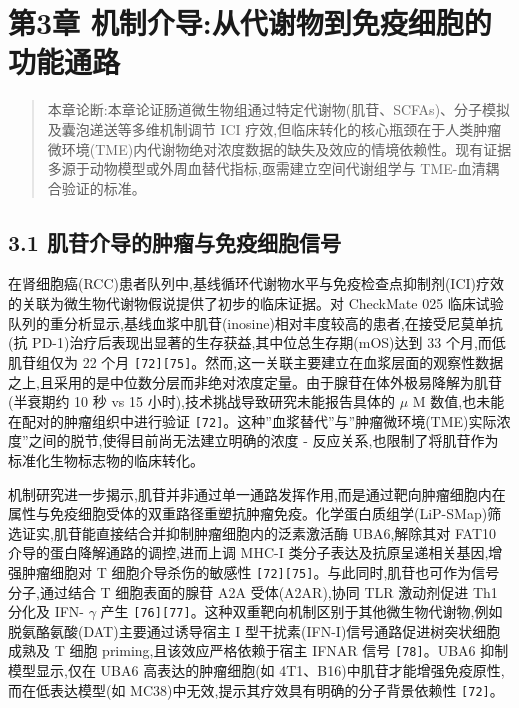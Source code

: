 \section{第3章 机制介导:从代谢物到免疫细胞的功能通路}\label{ux7b2c3ux7ae0-ux673aux5236ux4ecbux5bfcux4eceux4ee3ux8c22ux7269ux5230ux514dux75abux7ec6ux80deux7684ux529fux80fdux901aux8def}

\begin{quote}
本章论断:本章论证肠道微生物组通过特定代谢物(肌苷、SCFAs)、分子模拟及囊泡递送等多维机制调节 ICI 疗效,但临床转化的核心瓶颈在于人类肿瘤微环境(TME)内代谢物绝对浓度数据的缺失及效应的情境依赖性。现有证据多源于动物模型或外周血替代指标,亟需建立空间代谢组学与 TME-血清耦合验证的标准。
\end{quote}

\subsection{3.1 肌苷介导的肿瘤与免疫细胞信号}\label{ux808cux82f7ux4ecbux5bfcux7684ux80bfux7624ux4e0eux514dux75abux7ec6ux80deux4fe1ux53f7}

在肾细胞癌(RCC)患者队列中,基线循环代谢物水平与免疫检查点抑制剂(ICI)疗效的关联为微生物代谢物假说提供了初步的临床证据。对 CheckMate 025 临床试验队列的重分析显示,基线血浆中肌苷(inosine)相对丰度较高的患者,在接受尼莫单抗(抗 PD-1)治疗后表现出显著的生存获益,其中位总生存期(mOS)达到 33 个月,而低肌苷组仅为 22 个月 \texttt{{[}72{]}{[}75{]}}。然而,这一关联主要建立在血浆层面的观察性数据之上,且采用的是中位数分层而非绝对浓度定量。由于腺苷在体外极易降解为肌苷(半衰期约 10 秒 vs 15 小时),技术挑战导致研究未能报告具体的 \(\mu\) M 数值,也未能在配对的肿瘤组织中进行验证 \texttt{{[}72{]}}。这种''血浆替代''与''肿瘤微环境(TME)实际浓度''之间的脱节,使得目前尚无法建立明确的浓度 - 反应关系,也限制了将肌苷作为标准化生物标志物的临床转化。

机制研究进一步揭示,肌苷并非通过单一通路发挥作用,而是通过靶向肿瘤细胞内在属性与免疫细胞受体的双重路径重塑抗肿瘤免疫。化学蛋白质组学(LiP-SMap)筛选证实,肌苷能直接结合并抑制肿瘤细胞内的泛素激活酶 UBA6,解除其对 FAT10 介导的蛋白降解通路的调控,进而上调 MHC-I 类分子表达及抗原呈递相关基因,增强肿瘤细胞对 T 细胞介导杀伤的敏感性 \texttt{{[}72{]}{[}75{]}}。与此同时,肌苷也可作为信号分子,通过结合 T 细胞表面的腺苷 A2A 受体(A2AR),协同 TLR 激动剂促进 Th1 分化及 IFN- \(\gamma\) 产生 \texttt{{[}76{]}{[}77{]}}。这种双重靶向机制区别于其他微生物代谢物,例如脱氨酪氨酸(DAT)主要通过诱导宿主 I 型干扰素(IFN-I)信号通路促进树突状细胞成熟及 T 细胞 priming,且该效应严格依赖于宿主 IFNAR 信号 \texttt{{[}78{]}}。UBA6 抑制模型显示,仅在 UBA6 高表达的肿瘤细胞(如 4T1、B16)中肌苷才能增强免疫原性,而在低表达模型(如 MC38)中无效,提示其疗效具有明确的分子背景依赖性 \texttt{{[}72{]}}。

